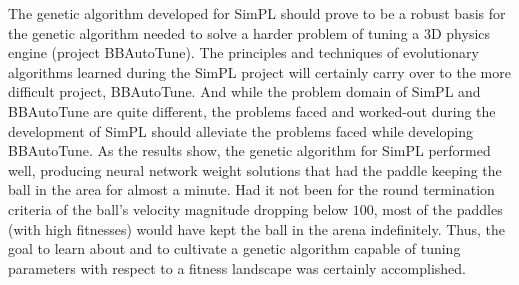 \documentclass[a4paper,10pt]{article}
\begin{document}
The genetic algorithm developed for SimPL should prove to be a robust basis for the genetic algorithm needed to solve a harder problem of tuning a 3D physics engine (project BBAutoTune). The principles and techniques of evolutionary algorithms learned during the SimPL project will certainly carry over to the more difficult project, BBAutoTune. And while the problem domain of SimPL and BBAutoTune are quite different, the problems faced and worked-out during the development of SimPL should alleviate the problems faced while developing BBAutoTune. As the results show, the genetic algorithm for SimPL performed well, producing neural network weight solutions that had the paddle keeping the ball in the area for almost a minute. Had it not been for the round termination criteria of the ball's velocity magnitude dropping below $100$, most of the paddles (with high fitnesses) would have kept the ball in the arena indefinitely. Thus, the goal to learn about and to cultivate a genetic algorithm capable of tuning parameters with respect to a fitness landscape was certainly accomplished.     



\end{document}
